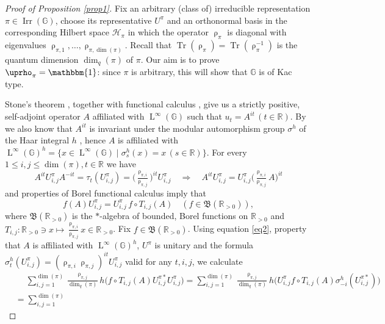 \documentclass{amsart}
\newcommand{\mc}{\mathcal}
\newcommand{\mf}{\mathfrak}
\newcommand{\I}{\mathbbm{1}}
\newcommand{\RR}{\mathbb{R}}
\newcommand{\GG}{\mathbb{G}}
\DeclareMathOperator{\Irr}{Irr}
\DeclareMathOperator{\Tr}{Tr}
\DeclareMathOperator{\LL}{L}
\theoremstyle{definition}
\numberwithin{equation}{section}
\begin{document}
\begin{proof}[Proof of Proposition \ref{prop1}]
Fix an arbitrary (class of) irreducible representation $\pi\in \Irr(\GG)$, choose its representative $U^{\pi}$ and an orthonormal basis in the corresponding Hilbert space $\mc{H}_\pi$ in which the operator $\uprho_\pi$ is diagonal with eigenvalues $\uprho_{\pi,1},\dotsc,\uprho_{\pi,\dim(\pi)}$. Recall that $\Tr(\uprho_\pi)=\Tr(\uprho_\pi^{-1})$ is the quantum dimension $\dim_q(\pi)$ of $\pi$. Our aim is to prove $\uprho_\pi=\I$: since $\pi$ is arbitrary, this will show that $\GG$ is of Kac type.

Stone's theorem \cite[Theorem 12.2]{SoltanPrimer}, together with functional calculus \cite[Section 10.2]{SoltanPrimer}, give us a strictly positive, self-adjoint operator $A$ affiliated with $\LL^{\infty}(\GG)$ such that $u_t=A^{it}\,(t\in\RR)$. By \cite[Lemma 3.2]{KSInvariants} we also know that $A^{it}$ is invariant under the modular automorphism group $\sigma^h$ of the Haar integral $h$ \cite{Stratila}, hence $A$ is affiliated with $\LL^\infty(\GG)^{h}=\{x\in\LL^{\infty}(\GG)\mid \sigma^h_s(x)=x\,(s\in\RR)\}$. For every $1\le i,j\le \dim(\pi), t\in\RR$ we have
\[
 A^{it}U^{\pi}_{i,j}A^{-it}=\tau_t(U^{\pi}_{i,j})=\bigl(\tfrac{\uprho_{\pi,i}}{\uprho_{\pi,j}}\bigr)^{it} U^{\pi}_{i,j}\quad\Rightarrow\quad 
A^{it} U^{\pi}_{i,j}=U^{\pi}_{i,j} \bigl(\tfrac{\uprho_{\pi,i}}{\uprho_{\pi,j}} A\bigr)^{it}
\]
and properties of Borel functional calculus imply that
\begin{equation}\label{eq2}
f(A)U^{\pi}_{i,j}=U^{\pi}_{i,j}\, f\circ T_{i,j}(A)\quad(f\in \mf{B}(\RR_{>0})),
\end{equation}
where $\mf{B}(\RR_{>0})$ is the $*$-algebra of bounded, Borel functions on $\RR_{>0}$ and $T_{i,j}\colon \RR_{>0}\ni x\mapsto \tfrac{\uprho_{\pi,i}}{\uprho_{\pi,j}} x\in \RR_{>0}$. Fix $f\in \mf{B}(\RR_{>0})$. Using equation \eqref{eq2}, property that $A$ is affiliated with $\LL^{\infty}(\GG)^h$, $U^{\pi}$ is unitary and the formula $\sigma^h_t(U^{\pi}_{i,j})=(\uprho_{\pi,i}\uprho_{\pi,j})^{it} U^{\pi}_{i,j}$ valid for any $t,i,j$, we calculate
\begin{equation}\begin{split}\label{eq1}
&\quad\;
\sum_{i,j=1}^{\dim(\pi)}
\tfrac{\uprho_{\pi,j}}{\dim_q(\pi)}h\bigl(f\circ T_{i,j}(A)U^{\pi *}_{i,j} U^{\pi}_{i,j}\bigr)=
\sum_{i,j=1}^{\dim(\pi)}
\tfrac{\uprho_{\pi,j}}{\dim_q(\pi)}h\bigl( U^{\pi}_{i,j}
f\circ T_{i,j}(A)\sigma^h_{-i}(U^{\pi *}_{i,j})\bigr)\\
&=
\sum_{i,j=1}^{\dim(\pi)}

\end{split}
\end{equation}
\end{proof}
\end{document}
